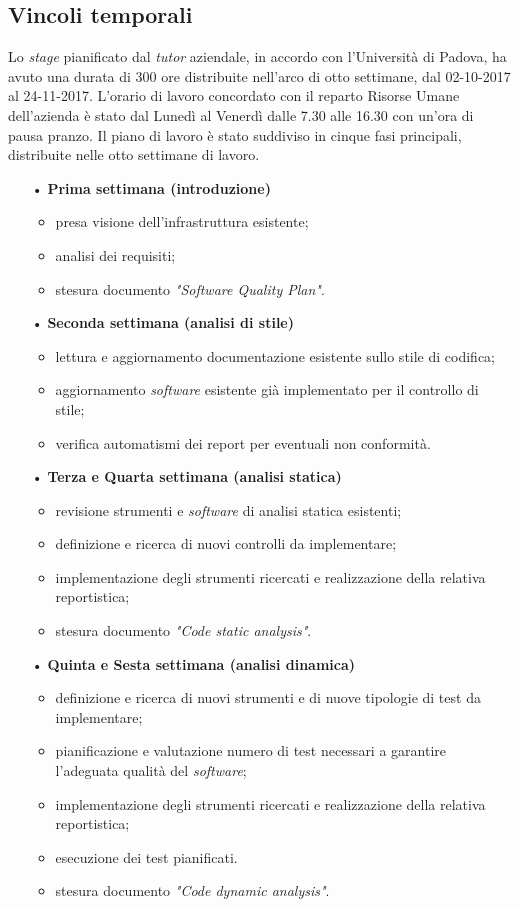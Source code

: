 \subsection{Vincoli temporali}
Lo \textit{stage} pianificato dal \textit{tutor} aziendale, in accordo con l'Università di Padova, ha avuto una durata di 300 ore distribuite nell'arco di otto settimane, dal 02-10-2017 al 24-11-2017. L'orario di lavoro concordato con il reparto Risorse Umane dell'azienda è stato dal Lunedì al Venerdì dalle 7.30 alle 16.30 con un'ora di pausa pranzo.
Il piano di lavoro è stato suddiviso in cinque fasi principali, distribuite nelle otto settimane di lavoro.
\begin{itemize}
\item[•] \textbf{Prima settimana (introduzione)}
	\begin{itemize}
	\item presa visione dell'infrastruttura esistente;
	\item analisi dei requisiti;
	\item stesura documento \textit{"Software Quality Plan"}.
	\end{itemize}
\item[•] \textbf{Seconda settimana (analisi di stile)}
	\begin{itemize}
	\item lettura e aggiornamento documentazione esistente sullo stile di codifica;
	\item aggiornamento \textit{software}  esistente già implementato per il controllo di stile;
	\item verifica automatismi dei report per eventuali non conformità.
	\end{itemize}
\item[•] \textbf{Terza e Quarta settimana (analisi statica)}
	\begin{itemize}
	\item revisione strumenti e \textit{software} di analisi statica esistenti;
	\item definizione e ricerca di nuovi controlli da implementare;
	\item implementazione degli strumenti ricercati e realizzazione della relativa reportistica;
	\item stesura documento \textit{"Code static analysis"}.
	\end{itemize}
	
\item[•] \textbf{Quinta e Sesta settimana (analisi dinamica)}
	\begin{itemize}
	\item definizione e ricerca di nuovi strumenti e di nuove tipologie di test da implementare;
	\item pianificazione e valutazione numero di test necessari a garantire l'adeguata qualità del \textit{software};
	\item implementazione degli strumenti ricercati e realizzazione della relativa reportistica;
	\item esecuzione dei test pianificati.
	\item stesura documento \textit{"Code dynamic analysis"}.
	\end{itemize}


\end{itemize}

